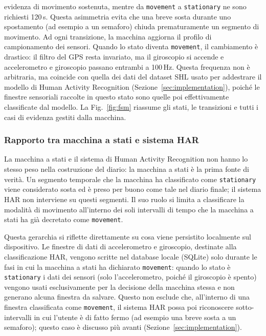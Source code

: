 \documentclass[conference]{IEEEtran}
\begin{document}
evidenza di movimento sostenuta, mentre da \texttt{movement} a
\texttt{stationary} ne sono richiesti 120\,s. Questa asimmetria evita
che una breve sosta durante uno spostamento (ad esempio a un semaforo)
chiuda prematuramente un
segmento di movimento. Ad ogni transizione, la macchina aggiorna il
profilo di campionamento dei sensori. Quando lo stato diventa
\texttt{movement}, il cambiamento è drastico: il filtro del GPS resta
invariato, ma il giroscopio si accende e accelerometro e giroscopio
passano entrambi a 100\,Hz. Questa frequenza non è arbitraria, ma
coincide con quella dei dati del dataset SHL usato per addestrare il
modello di Human Activity Recognition (Sezione~\ref{sec:implementation}),
poiché le finestre sensoriali raccolte in questo stato sono quelle
poi effettivamente classificate dal modello. La Fig.~\ref{fig:fsm}
riassume gli stati, le transizioni e tutti i casi di evidenza gestiti
dalla macchina.

\subsubsection{Rapporto tra macchina a stati e sistema HAR}

La macchina a stati e il sistema di Human Activity Recognition non
hanno lo stesso peso nella costruzione del diario: la macchina a stati
è la prima fonte di verità. Un segmento temporale che la macchina ha
classificato come \texttt{stationary} viene considerato sosta ed è
preso per buono come tale nel diario finale; il sistema HAR non
interviene su questi segmenti. Il suo ruolo si limita a classificare
la modalità di movimento all'interno dei soli intervalli di tempo che
la macchina a stati ha già decretato come \texttt{movement}.

Questa gerarchia si riflette direttamente su cosa viene persistito
localmente sul dispositivo. Le finestre di dati di accelerometro e
giroscopio, destinate alla classificazione HAR, vengono scritte nel
database locale (SQLite) solo durante le fasi in cui la macchina a
stati ha dichiarato \texttt{movement}: quando lo stato è
\texttt{stationary} i dati dei sensori (solo l'accelerometro, poiché
il giroscopio è spento) vengono usati esclusivamente per la decisione
della macchina stessa e non generano alcuna finestra da salvare. Questo non esclude che, all'interno di una finestra
classificata come \texttt{movement}, il sistema HAR possa poi
riconoscere sotto-intervalli in cui l'utente è di fatto fermo (ad
esempio una breve sosta a un semaforo); questo caso è discusso più
avanti (Sezione~\ref{sec:implementation}).
\end{document}
